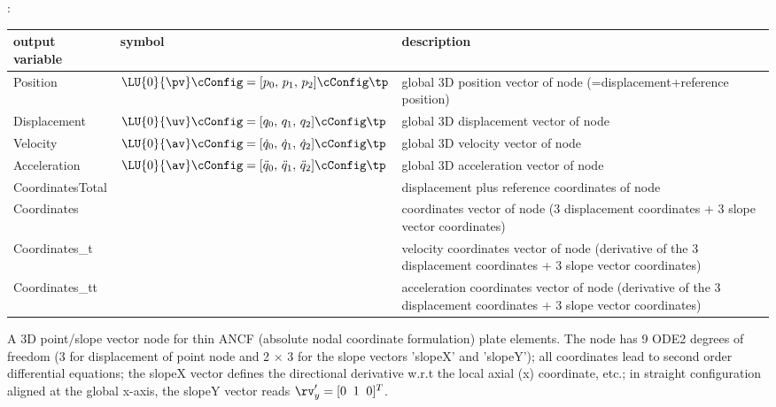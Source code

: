:
\begin{center}
\footnotesize
\begin{longtable}{| p{5cm} | p{5cm} | p{6cm} |} 
\hline
\bf output variable & \bf symbol & \bf description \\ \hline
Position & $\LU{0}{\pv}\cConfig = [p_0,\, p_1,\, p_2]\cConfig\tp$ & global 3D position vector of node (=displacement+reference position)\\ \hline
Displacement & $\LU{0}{\uv}\cConfig = [q_0,\, q_1,\, q_2]\cConfig\tp$ & global 3D displacement vector of node\\ \hline
Velocity & $\LU{0}{\av}\cConfig = [\dot q_0,\,\dot q_1,\,\dot q_2]\cConfig\tp$ & global 3D velocity vector of node\\ \hline
Acceleration & $\LU{0}{\av}\cConfig = [\ddot q_0,\,\ddot q_1,\,\ddot q_2]\cConfig\tp$ & global 3D acceleration vector of node\\ \hline
CoordinatesTotal &  & displacement plus reference coordinates of node\\ \hline
Coordinates &  & coordinates vector of node (3 displacement coordinates + 3 slope vector coordinates)\\ \hline
Coordinates\_t &  & velocity coordinates vector of node (derivative of the 3 displacement coordinates + 3 slope vector coordinates)\\ \hline
Coordinates\_tt &  & acceleration coordinates vector of node (derivative of the 3 displacement coordinates + 3 slope vector coordinates)\\ \hline
\end{longtable}
\end{center}
\newpage


\label{sec:item:NodePointSlope12}
A 3D point/slope vector node for thin ANCF (absolute nodal coordinate formulation) plate elements. The node has 9 ODE2 degrees of freedom (3 for displacement of point node and 2 $\times$ 3 for the slope vectors 'slopeX' and 'slopeY'); all coordinates lead to second order differential equations; the slopeX vector defines the directional derivative w.r.t the local axial (x) coordinate, etc.; in straight configuration aligned at the global x-axis, the slopeY vector reads $\rv_y^\prime=[0\;\;1\;\;0]^T$.
\vspace{12pt}\\

